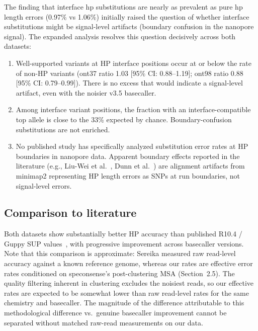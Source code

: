 \documentclass[11pt]{article}
\begin{document}
The finding that interface hp substitutions are nearly as prevalent as pure hp
length errors (0.97\% vs 1.06\%) initially raised the question of whether
interface substitutions might be signal-level artifacts (boundary confusion in
the nanopore signal). The expanded analysis resolves this question decisively
across both datasets:

\begin{enumerate}
\item Well-supported variants at HP interface positions occur at or below the
  rate of non-HP variants (ont37 ratio 1.03 [95\% CI: 0.88--1.19]; ont98 ratio
  0.88 [95\% CI: 0.79--0.99]). There is no excess that would indicate a
  signal-level artifact, even with the noisier v3.5 basecaller.

\item Among interface variant positions, the fraction with an
  interface-compatible top allele is close to the 33\% expected by chance.
  Boundary-confusion substitutions are not enriched.

\item No published study has specifically analyzed substitution error rates at
  HP boundaries in nanopore data. Apparent boundary effects reported in the
  literature (e.g., Liu-Wei et al.~\cite{liuwei2024}, Dunn et
  al.~\cite{dunn2023}) are alignment artifacts from minimap2 representing HP
  length errors as SNPs at run boundaries, not signal-level errors.
\end{enumerate}

\subsection{Comparison to literature}

Both datasets show substantially better HP accuracy than published R10.4
/ Guppy SUP values~\cite{sereika2022}, with progressive improvement across
basecaller versions. Note that this comparison is approximate: Sereika measured
raw read-level accuracy against a known reference genome, whereas our rates are
effective error rates conditioned on speconsense's post-clustering MSA
(Section~2.5). The quality filtering inherent in clustering excludes the
noisiest reads, so our effective rates are expected to be somewhat lower than
raw read-level rates for the same chemistry and basecaller. The magnitude of
the difference attributable to this methodological difference vs.\ genuine
basecaller improvement cannot be separated without matched raw-read
measurements on our data.
\end{document}
